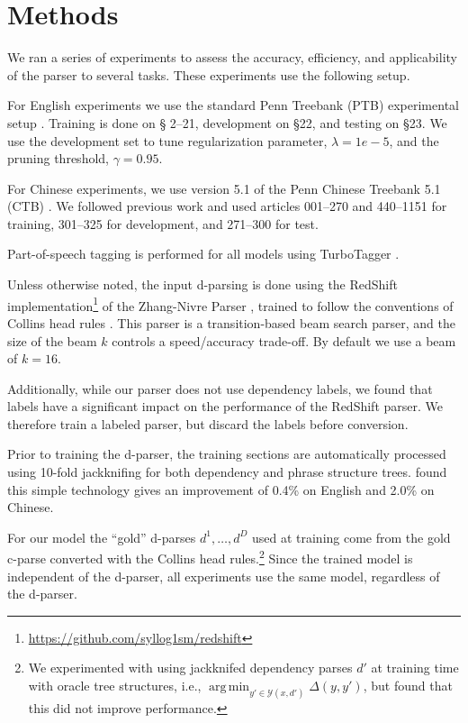 \documentclass[11pt,letterpaper]{article}
\DeclareMathOperator*{\argmin}{arg\,min}
\begin{document}
\section{Methods}

We ran a series of experiments to assess the accuracy, efficiency,
and applicability of the parser to several tasks. These experiments
use the following setup.  

For English experiments we use the standard Penn Treebank (PTB)
experimental setup \cite{marcus1993building}. Training is done on \S
2--21, development on \S 22, and testing on \S 23. We use the development set 
to tune 
regularization parameter, $\lambda=1e-5$, and the pruning threshold, $\gamma=0.95$.


For Chinese experiments, we use version 5.1 of the Penn  Chinese Treebank 5.1 (CTB) \cite{xue2005penn}. We followed previous work and used
articles 001--270 and 440--1151 for training, 
301--325 for development, and 
271--300 for test.

Part-of-speech tagging is performed for all models  using TurboTagger
\cite{martins2013turning}. 

Unless otherwise noted, the input d-parsing is done using the RedShift
implementation\footnote{\url{https://github.com/syllog1sm/redshift}}
of the Zhang-Nivre Parser \cite{zhang2011transition}, trained to
follow the conventions of Collins head rules
\cite{collins2003head}. This parser is a transition-based beam search
parser, and the size of the beam $k$ controls a speed/accuracy trade-off.
By default we use a beam of $k=16$. 

Additionally, while our parser does not use dependency labels, 
we found that labels have a significant impact on the performance of
the RedShift parser. We therefore train a labeled parser, but 
discard the labels before conversion.


Prior to training the d-parser, the training sections are
automatically processed  using 10-fold jackknifing \cite{collins2000} for both dependency and phrase structure trees.  found this
simple technology gives an improvement of 0.4\% on English and 2.0\% on Chinese.

For our model the ``gold'' d-parses $d^1, \ldots, d^D$   
used at training come from the gold c-parse converted with 
the Collins head rules.\footnote{We experimented with using
  jackknifed dependency parses $d'$ at training time with oracle tree
  structures, i.e., $\argmin_{y' \in \mathcal{Y}(x, d')} \Delta(y, y')$,
  but found that this did not improve performance.} Since the trained
model is independent of the d-parser,  
all experiments use the same model, regardless of the d-parser.
\end{document}
